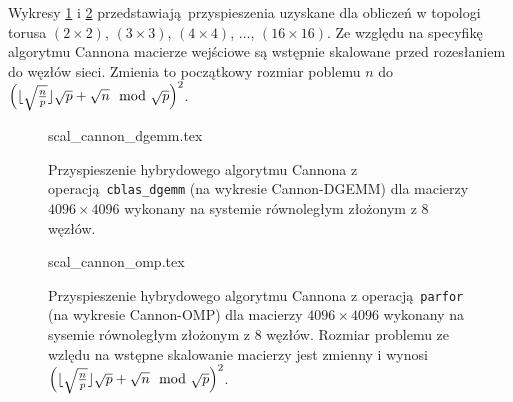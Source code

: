 \clearpage

Wykresy \ref{pl:scal_cannon_dgemm} i \ref{pl:scal_cannon_omp} przedstawiają przyspieszenia uzyskane dla obliczeń w topologi torusa \((2\times 2)\), \((3\times 3)\), \((4\times 4)\), \(\dots\), \((16\times 16)\). Ze względu na specyfikę algorytmu Cannona macierze wejściowe są wstępnie skalowane przed rozesłaniem do węzłów sieci. Zmienia to początkowy rozmiar poblemu \(n\) do \(\left( \lfloor \sqrt{\frac{n}{p}} \rfloor \sqrt{p} + \sqrt{n}\mod{\sqrt{p}}\right)^2\).

\begin{figure}[H]
\centering
\footnotesize
{scal_cannon_dgemm.tex}
\caption{Przyspieszenie hybrydowego algorytmu Cannona z operacją \texttt{cblas\_dgemm} (na wykresie Cannon-DGEMM) dla macierzy \(4096\times 4096\) wykonany na systemie równoległym złożonym z 8 węzłów.}
\label{pl:scal_cannon_dgemm}
\end{figure}


\begin{figure}[H]
\centering
\footnotesize
{scal_cannon_omp.tex}
\caption{Przyspieszenie hybrydowego algorytmu Cannona z operacją \texttt{parfor} (na wykresie Cannon-OMP) dla macierzy \(4096\times 4096\) wykonany na sysemie równoległym złożonym z 8 węzłów. Rozmiar problemu ze wzlędu na wstępne skalowanie macierzy jest zmienny i wynosi \(\left( \lfloor \sqrt{\frac{n}{p}} \rfloor \sqrt{p} + \sqrt{n}\mod{\sqrt{p}}\right)^2\). }
\label{pl:scal_cannon_omp}
\end{figure}

